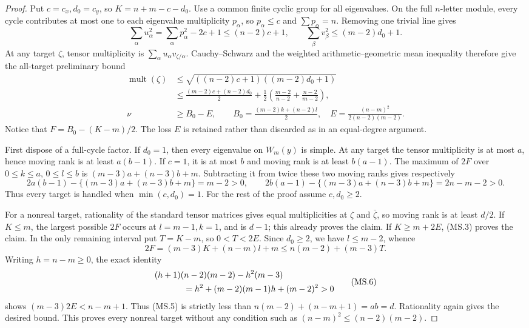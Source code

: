 \begin{proof}
Put $c=c_x,d_0=c_y$, so $K=n+m-c-d_0$.
Use a common finite cyclic group for all eigenvalues. On the full
$n$-letter module, every cycle contributes at most one to each
eigenvalue multiplicity $p_\alpha$, so $p_\alpha\le c$ and
$\sum p_\alpha=n$. Removing one trivial line gives
\[
 \sum_\alpha u_\alpha^2
 =\sum_\alpha p_\alpha^2-2c+1\le(n-2)c+1,
 \qquad
 \sum_\beta v_\beta^2\le(m-2)d_0+1.
 \tag{MS.2}
\]
At any target $\zeta$, tensor multiplicity is
$\sum_\alpha u_\alpha v_{\zeta/\alpha}$.
Cauchy--Schwarz and the weighted arithmetic--geometric mean inequality
therefore give the all-target preliminary bound
\[
 \begin{split}
 \operatorname{mult}(\zeta)
 &\le\sqrt{((n-2)c+1)((m-2)d_0+1)}\\
 &\le\frac{(m-2)c+(n-2)d_0}{2}
       +\frac12\left(\frac{m-2}{n-2}+\frac{n-2}{m-2}\right),\\
 \nu&\ge B_0-E,\qquad
 B_0=\frac{(m-2)k+(n-2)l}{2},\quad
 E=\frac{(n-m)^2}{2(n-2)(m-2)}.
 \end{split}
 \tag{MS.3}
\]
Notice that $F=B_0-(K-m)/2$. The loss $E$ is retained rather
than discarded as in an equal-degree argument.

First dispose of a full-cycle factor. If $d_0=1$, then every
eigenvalue on $W_m(y)$ is simple. At any target the tensor
multiplicity is at most $a$, hence moving rank is at least
$a(b-1)$. If $c=1$, it is at most $b$ and moving rank is at
least $b(a-1)$. The maximum of $2F$ over
$0\le k\le a$, $0\le l\le b$ is
$(m-3)a+(n-3)b+m$. Subtracting it from twice these two moving
ranks gives respectively
\[
 2a(b-1)-\{(m-3)a+(n-3)b+m\}=m-2>0,
 \qquad
 2b(a-1)-\{(m-3)a+(n-3)b+m\}=2n-m-2>0.
 \tag{MS.4}
\]
Thus every target is handled when $\min(c,d_0)=1$.
For the rest of the proof assume $c,d_0\ge2$.

For a nonreal target, rationality of the standard tensor matrices
gives equal multiplicities at $\zeta$ and $\bar\zeta$, so moving
rank is at least $d/2$. If $K\le m$, the largest possible $2F$
occurs at $l=m-1,k=1$, and is $d-1$; this already proves the
claim. If $K\ge m+2E$, (MS.3) proves the claim.
In the only remaining interval put $T=K-m$, so $0<T<2E$.
Since $d_0\ge2$, we have $l\le m-2$, whence
\[
 2F=(m-3)K+(n-m)l+m
       \le n(m-2)+(m-3)T.
 \tag{MS.5}
\]
Writing $h=n-m\ge0$, the exact identity
\[
 \begin{split}
 &(h+1)(n-2)(m-2)-h^2(m-3)\\
 &\hspace{12mm}=h^2+(m-2)(m-1)h+(m-2)^2>0
 \end{split}
 \tag{MS.6}
\]
shows $(m-3)2E<n-m+1$. Thus (MS.5) is strictly less than
$n(m-2)+(n-m+1)=ab=d$. Rationality again gives the desired
bound. This proves every nonreal target without any condition
such as $(n-m)^2\le(n-2)(m-2)$.


\end{proof}
